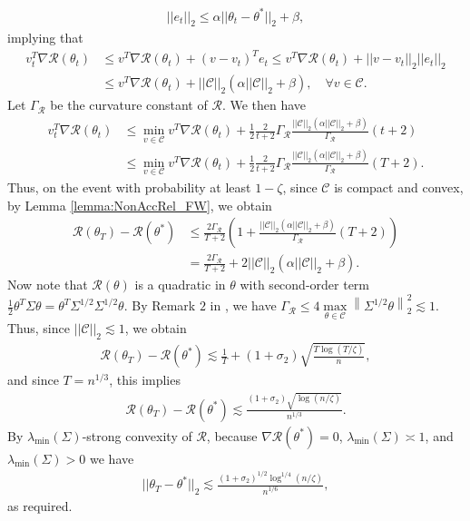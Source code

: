 \documentclass{article}
\begin{document}
\begin{align*}
||e_t||_2 \leq \alpha||\theta_t - \theta^*||_2 + \beta,
\end{align*}
implying that
\begin{align*}
v_t^T\nabla\mathcal{R}(\theta_t) &\leq v^T\nabla\mathcal{R}(\theta_t) + (v - v_t)^Te_t \leq v^T\nabla\mathcal{R}(\theta_t) + ||v - v_t||_2||e_t||_2\\
&\leq v^T\nabla\mathcal{R}(\theta_t) + ||\mathcal{C}||_2(\alpha ||\mathcal{C}||_2 + \beta), \quad \forall v \in \mathcal{C}.
\end{align*}
Let $\Gamma_{\mathcal{R}}$ be the curvature constant of $\mathcal{R}$. We then have
\begin{align*}
v_t^T\nabla\mathcal{R}(\theta_t) &\leq \mathop{\min}\limits_{v \in \mathcal{C}}v^T\nabla\mathcal{R}(\theta_t) + \frac{1}{2}\frac{2}{t + 2}\Gamma_{\mathcal{R}}\frac{||\mathcal{C}||_2(\alpha ||\mathcal{C}||_2 + \beta)}{\Gamma_{\mathcal{R}}}(t + 2)\\
&\leq \mathop{\min}\limits_{v \in \mathcal{C}}v^T\nabla\mathcal{R}(\theta_t) + \frac{1}{2}\frac{2}{t + 2}\Gamma_{\mathcal{R}}\frac{||\mathcal{C}||_2(\alpha ||\mathcal{C}||_2 + \beta)}{\Gamma_{\mathcal{R}}}(T + 2).
\end{align*}
Thus, on the event with probability at least $1 - \zeta$, since $\mathcal{C}$ is compact and convex, by Lemma \ref{lemma:NonAccRel_FW}, we obtain
\begin{align*}
\mathcal{R}(\theta_T) - \mathcal{R}(\theta^*) &\leq \frac{2\Gamma_{\mathcal{R}}}{T + 2}\left(1 + \frac{||\mathcal{C}||_2(\alpha ||\mathcal{C}||_2 + \beta)}{\Gamma_{\mathcal{R}}}(T + 2)\right)\\
&= \frac{2\Gamma_{\mathcal{R}}}{T + 2} + 2||\mathcal{C}||_2(\alpha ||\mathcal{C}||_2 + \beta).
\end{align*}
Now note that $\mathcal{R}(\theta)$ is a quadratic in $\theta$ with second-order term $\frac{1}{2}\theta^T\Sigma\theta = \theta^T\Sigma^{1/2}\Sigma^{1/2}\theta$.
By Remark $2$ in \cite{NOPL}, we have $\Gamma_{\mathcal{R}} \leq 4\mathop{\max}\limits_{\theta \in \mathcal{C}}\left\|\Sigma^{1/2}\theta\right\|_2^2 \lesssim 1$. Thus, since $||\mathcal{C}||_2 \lesssim 1$, we obtain
\begin{align*}
\mathcal{R}(\theta_T) - \mathcal{R}(\theta^*) \lesssim \frac{1}{T} + (1 + \sigma_2)\sqrt{\frac{T\log(T/\zeta)}{n}},
\end{align*}
and since $T = n^{1/3}$, this implies
\begin{align*}
\mathcal{R}(\theta_T) - \mathcal{R}(\theta^*) \lesssim \frac{(1 + \sigma_2)\sqrt{\log(n/\zeta)}}{n^{1/3}}.
\end{align*}
By $\lambda_{\min}(\Sigma)$-strong convexity of $\mathcal{R}$, because $\nabla\mathcal{R}(\theta^*) = 0$, $\lambda_{\min}(\Sigma) \asymp 1$, and $\lambda_{\min}(\Sigma) > 0$ we have
\begin{align*}
||\theta_T - \theta^*||_2 \lesssim \frac{(1 + \sigma_2)^{1/2}\log^{1/4}(n/\zeta)}{n^{1/6}},
\end{align*}
as required.
\end{document}
